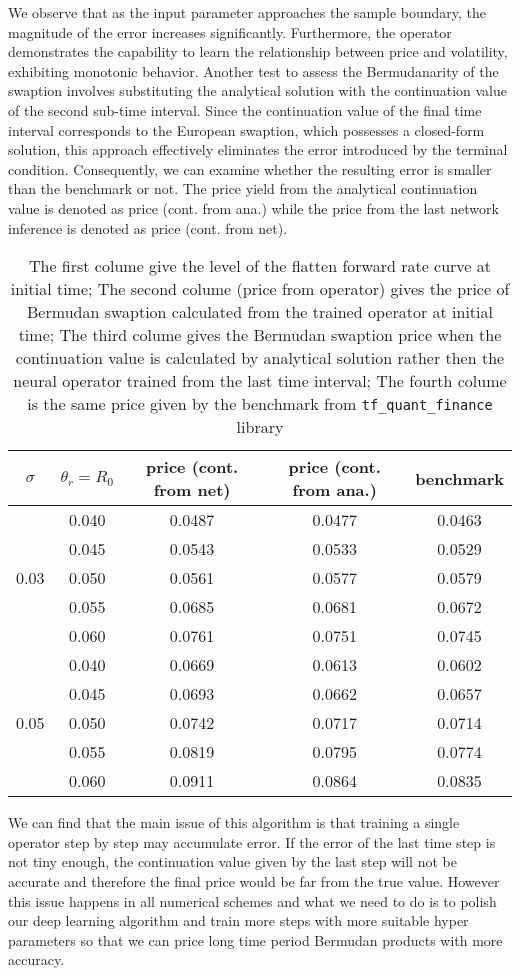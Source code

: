 \documentclass[11pt,a4paper]{article}
\theoremstyle{remark}
\begin{document}
	We observe that as the input parameter approaches the sample boundary, the magnitude of the error increases significantly. Furthermore, the operator demonstrates the capability to learn the relationship between price and volatility, exhibiting monotonic behavior. Another test to assess the Bermudanarity of the swaption involves substituting the analytical solution with the continuation value of the second sub-time interval. Since the continuation value of the final time interval corresponds to the European swaption, which possesses a closed-form solution, this approach effectively eliminates the error introduced by the terminal condition. Consequently, we can examine whether the resulting error is smaller than the benchmark or not. The price yield from the analytical continuation value is denoted as price (cont. from ana.) while the price from the last network inference is denoted as  price (cont. from net).
	\begin{table}[htbp]
		\centering
		\begin{tabular}{ccccc}
			\hline
			$\sigma$&$\theta_r = R_0$  & price (cont. from net) & price (cont. from ana.) &benchmark \\
			\hline
			\multirow{5}{*}{0.03} &0.040 & 0.0487 & 0.0477& 0.0463 \\
			&0.045 & 0.0543  & 0.0533 & 0.0529 \\
			&0.050 & 0.0561  & 0.0577 & 0.0579 \\
			&0.055 & 0.0685  & 0.0681  &0.0672 \\
			&0.060 & 0.0761  & 0.0751  &0.0745 \\
			\hline  
			\multirow{5}{*}{0.05} &0.040 & 0.0669  & 0.0613& 0.0602 \\
			&0.045 & 0.0693  & 0.0662 & 0.0657 \\
			&0.050 & 0.0742  & 0.0717 & 0.0714 \\
			&0.055 & 0.0819  & 0.0795 & 0.0774 \\
			&0.060 & 0.0911  & 0.0864 & 0.0835 \\
			\hline
			
		\end{tabular}
		\caption{The first colume give the level of the flatten forward rate curve at initial time; The second colume (price from operator) gives the price of Bermudan swaption calculated from the trained operator at initial time; The third colume gives the Bermudan swaption price when the continuation value is calculated by analytical solution rather then the neural operator trained from the last time interval; The fourth colume is the same price given by the benchmark from \texttt{tf\_quant\_finance} library}
		\label{tab:structure1}
	\end{table}
	We can find that the main issue of this algorithm is that training a single operator step by step may accumulate error. If the error of the last time step is not tiny enough, the continuation value given by the last step will not be accurate and therefore the final price would be far from the true value. However this issue happens in all numerical schemes and what we need to do is to polish our deep learning algorithm and train more steps with more suitable hyper parameters so that we can price long time period Bermudan products with more accuracy.
\end{document}
